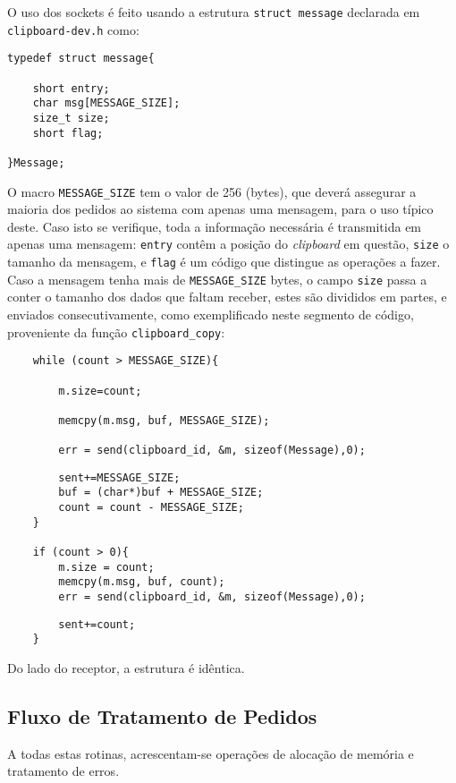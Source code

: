 \documentclass{article}
\begin{document}
O uso dos sockets é feito usando a estrutura \texttt{struct message} declarada em \texttt{clipboard-dev.h} como:
\begin{verbatim}
typedef struct message{
	
	short entry; 
	char msg[MESSAGE_SIZE];
	size_t size; 
	short flag; 
	
}Message;
\end{verbatim}
O macro \texttt{MESSAGE\_SIZE} tem o valor de 256 (bytes), que deverá assegurar a maioria dos pedidos ao sistema com apenas uma mensagem, para o uso típico deste. 
Caso isto se verifique, toda a informação necessária é transmitida em apenas uma mensagem: \texttt{entry} contêm a posição do \textit{clipboard} em questão, \texttt{size} o tamanho da mensagem, e \texttt{flag} é um código que distingue as operações a fazer.
Caso a mensagem tenha mais de \texttt{MESSAGE\_SIZE} bytes, o campo \texttt{size} passa a conter o tamanho dos dados que faltam receber, estes são divididos em partes, e enviados consecutivamente, como exemplificado neste segmento de código, proveniente da função \texttt{clipboard_copy}:
\begin{verbatim}
	while (count > MESSAGE_SIZE){
	
		m.size=count;
	
		memcpy(m.msg, buf, MESSAGE_SIZE);
		
		err = send(clipboard_id, &m, sizeof(Message),0);
\end{verbatim}
\begin{verbatim}
		sent+=MESSAGE_SIZE;
		buf = (char*)buf + MESSAGE_SIZE;
		count = count - MESSAGE_SIZE;
	}
	
	if (count > 0){
		m.size = count;
		memcpy(m.msg, buf, count);
		err = send(clipboard_id, &m, sizeof(Message),0);
\end{verbatim}
\begin{verbatim}
		sent+=count;
	}
\end{verbatim}
Do lado do receptor, a estrutura é idêntica.



\subsection{Fluxo de Tratamento de Pedidos}

A todas estas rotinas, acrescentam-se operações de alocação de memória e tratamento de erros.
\end{document}
